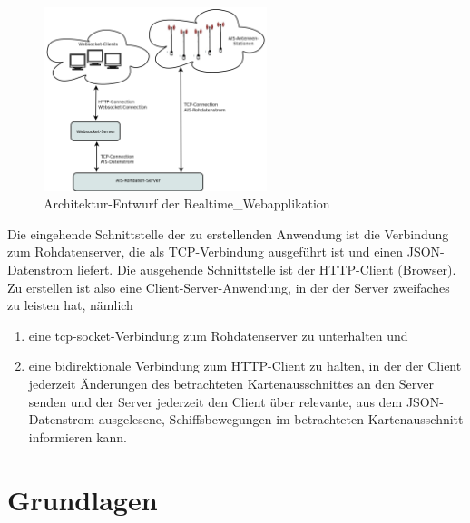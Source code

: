 \begin{figure}
  \begin{center}
    \includegraphics[width=0.58\textwidth]{images/Exposee_graphik_Realtimeapp}
  \end{center}
  \caption{Architektur-Entwurf der Realtime\_Webapplikation}
\end{figure}
Die eingehende Schnittstelle der zu erstellenden Anwendung ist die Verbindung zum Rohdatenserver, die als TCP-Verbindung ausgeführt ist und einen JSON-Datenstrom liefert.
Die ausgehende Schnittstelle ist der HTTP-Client (Browser).
Zu erstellen ist also eine Client-Server-Anwendung, in der der Server zweifaches zu leisten hat, nämlich 
\begin{enumerate}
 \item eine tcp-socket-Verbindung zum Rohdatenserver zu unterhalten und
  \item eine bidirektionale Verbindung zum HTTP-Client zu halten, in der der Client jederzeit Änderungen des betrachteten Kartenausschnittes an den Server senden und der Server jederzeit den Client über relevante, aus dem JSON-Datenstrom ausgelesene, Schiffsbewegungen im betrachteten Kartenausschnitt informieren kann.
\end{enumerate}


\chapter{Grundlagen}\label{s.Grundlagen}
